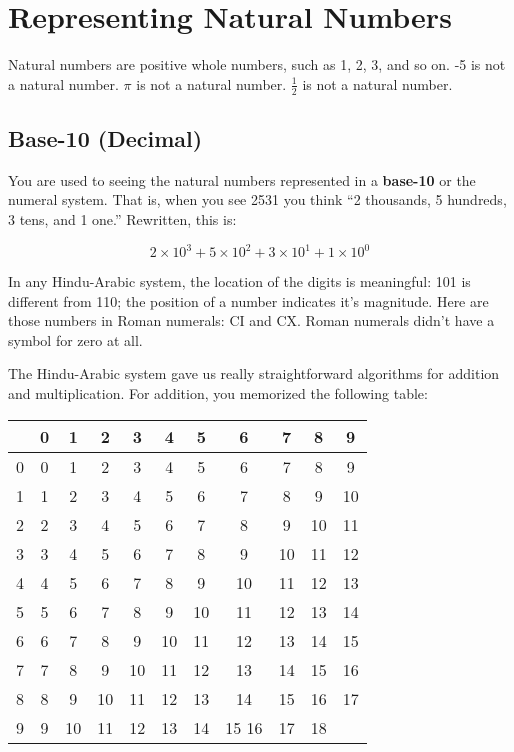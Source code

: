 \chapter{Representing Natural Numbers}

Natural numbers are positive whole numbers, such as 1, 2, 3, and so on. -5 is not a natural
number. $\pi$ is not a natural number. $\frac{1}{2}$ is not a natural
number.

\section{Base-10 (Decimal)}
You are used to seeing the natural numbers represented in a \textbf{base-10}
 or the  numeral system. That is, when you see 2531 you
think ``2 thousands, 5 hundreds, 3 tens, and 1 one.'' Rewritten, this is:

$$2 \times 10^3 + 5 \times 10^2 + 3 \times 10^1 + 1 \times 10^0$$

In any Hindu-Arabic system, the location of the digits is meaningful:
101 is different from 110; the position of a number indicates it's magnitude. Here are those numbers in Roman numerals:
CI and CX. Roman numerals didn't have a symbol for zero at all.

The Hindu-Arabic system gave us really straightforward algorithms for
addition and multiplication. For addition, you memorized the following table:

\begin{tabular}{ c || c | c | c | c | c | c| c| c| c| c }
 & 0 & 1 & 2 & 3 & 4 & 5 & 6 & 7 & 8 & 9 \\
 \hline
0 & 0 & 1 & 2 & 3 & 4 & 5 & 6 & 7 & 8 & 9 \\
1 & 1 & 2 & 3 & 4 & 5 & 6 & 7 & 8 & 9 & 10 \\
2 & 2 & 3 & 4 & 5 & 6 & 7 & 8 & 9 & 10 & 11\\
3 & 3 & 4 & 5 & 6 & 7 & 8 & 9 & 10 & 11 & 12\\
4 & 4 & 5 & 6 & 7 & 8 & 9 & 10 & 11 & 12 & 13\\
5 & 5 & 6 & 7 & 8 & 9 & 10 & 11 & 12 & 13 & 14\\
6 & 6 & 7 & 8 & 9 & 10 & 11 & 12 & 13 & 14 & 15\\
7 & 7 & 8 & 9 & 10 & 11 & 12 & 13 & 14 & 15 & 16\\
8 & 8 & 9 & 10 & 11 & 12 & 13 & 14 & 15 & 16 & 17\\
9 & 9 & 10 & 11 & 12 & 13 & 14 & 15 16 & 17 & 18\\
\end{tabular}


